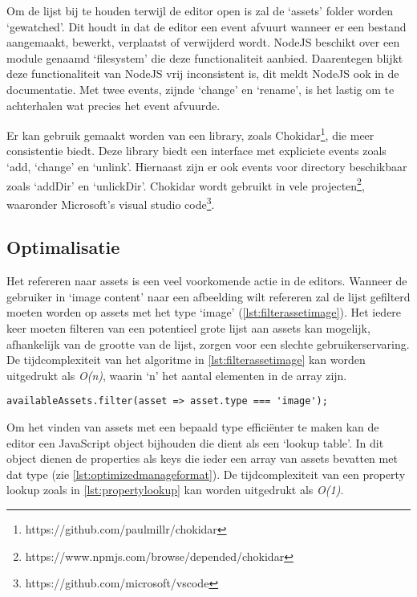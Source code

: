 Om de lijst bij te houden terwijl de editor open is zal de ‘assets’ folder worden ‘gewatched’. Dit houdt in dat de editor een event afvuurt wanneer er een bestand aangemaakt, bewerkt, verplaatst of verwijderd wordt. NodeJS beschikt over een module genaamd ‘filesystem’ die deze functionaliteit aanbied. Daarentegen blijkt deze functionaliteit van NodeJS vrij inconsistent is, dit meldt NodeJS ook in de documentatie\cite{NodeDocFS}. Met twee events, zijnde ‘change’ en ‘rename’, is het lastig om te achterhalen wat precies het event afvuurde. 

Er kan gebruik gemaakt worden van een library, zoals Chokidar\footnote{https://github.com/paulmillr/chokidar}, die meer consistentie biedt. Deze library biedt een interface met expliciete events zoals ‘add, ‘change’ en ‘unlink’. Hiernaast zijn er ook events voor directory beschikbaar zoals ‘addDir’ en ‘unlickDir’. Chokidar wordt gebruikt in vele projecten\footnote{https://www.npmjs.com/browse/depended/chokidar}, waaronder Microsoft’s visual studio code\footnote{https://github.com/microsoft/vscode}. 

\subsection{Optimalisatie}
\label{subsec:optimalisationformat}
Het refereren naar assets is een veel voorkomende actie in de editors. Wanneer de gebruiker in ‘image content’ naar een afbeelding wilt refereren zal de lijst gefilterd moeten worden op assets met het type ‘image’ (\autoref{lst:filterassetimage}). Het iedere keer moeten filteren van een potentieel grote lijst aan assets kan mogelijk, afhankelijk van de grootte van de lijst, zorgen voor een slechte gebruikerservaring. De tijdcomplexiteit van het algoritme in \autoref{lst:filterassetimage} kan worden uitgedrukt als \textit{O(n)}, waarin ‘n’ het aantal elementen in de array zijn. 

\lstset{language=JavaScript}
\begin{lstlisting}[caption={Het filteren van assets met het type 'image'.},captionpos=b,label={lst:filterassetimage}]
availableAssets.filter(asset => asset.type === 'image');
\end{lstlisting}

Om het vinden van assets met een bepaald type efficiënter te maken kan de editor een JavaScript object bijhouden die dient als een ‘lookup table’. In dit object dienen de properties als keys die ieder een array van assets bevatten met dat type (zie \autoref{lst:optimizedmanageformat}). De tijdcomplexiteit van een property lookup zoals in \autoref{lst:propertylookup} kan worden uitgedrukt als \textit{O(1)}.

